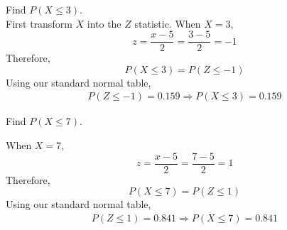 \begin{example}
\begin{benumerate}
\item Find $P(X \leq 3)$.\\

First transform $X$ into the $Z$ statistic. When $X=3$,
\[ z = \frac{x-5}{2} = \frac{3-5}{2} = -1 \]
Therefore,
\[ P (X \leq 3) = P( Z \leq -1)\]
Using our standard normal table,
\begin{align*}
 P(Z \leq -1) = 0.159
 \Rightarrow P(X \leq 3) = 0.159
\end{align*}

\item Find $P(X \leq 7)$.

When $X=7$,
\[ z = \frac{x-5}{2} = \frac{7-5}{2} = 1 \]
Therefore,
\[ P(X \leq 7) = P(Z \leq 1) \]
Using our standard normal table,
\begin{align*}
P(Z \leq 1) = 0.841
\Rightarrow P(X \leq 7) = 0.841
\end{align*}


\end{benumerate}
\end{example}
